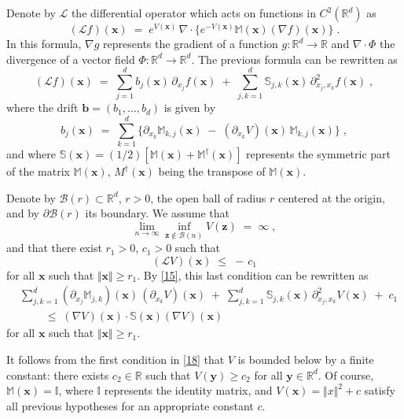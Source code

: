 \documentclass[reqno]{amsart}
\newcounter{as}[section]
\newcommand{\mc}[1]{{\mathcal #1}}
\newcommand{\bb}[1]{{\mathbb #1}}
\newcommand{\bs}[1]{{\boldsymbol #1}}
\newcommand{\<}{\langle}
\renewcommand{\>}{\rangle}
\begin{document}
Denote by $\mathcal L$ the differential operator which acts on functions in
$C^2(\bb R^d)$ as
\begin{equation}\label{gen1}
(\mathcal L f) (\bs{x}) \;=\; e^{V(\bs{x})} \, \nabla \cdot
\big\{ e^{-V(\bs{x})} \bb M(\bs{x}) (\nabla f)(\bs{x}) \big\}\;.
\end{equation}
In this formula, $\nabla g$ represents the gradient of a function
$g\colon\bb R^d \to \bb R$ and $\nabla \cdot \Phi$ the divergence of a
vector field $\Phi \colon\bb R^d \to \bb R^d$.  The previous formula can
be rewritten as
\begin{equation}
\label{15}
(\mathcal L f) (\bs{x}) \;=\; \sum_{j=1}^d b_j(\bs{x}) \, \partial_{x_j} f (\bs{x})
\;+\; \sum_{j,k=1}^d \bb S_{j,k} (\bs{x}) \, \partial^2_{x_j, x_k} f (\bs{x}) \;,
\end{equation}
where the drift $\bs b=(b_1, \dots, b_d)$ is given by
\begin{equation}
\label{drift1}
b_j(\bs{x}) \;=\; \sum_{k=1}^d \Big\{  \partial_{x_k} \bb M_{k,j}(\bs{x})
\;-\; (\partial_{x_k} V) (\bs{x}) \, \bb M_{k,j}(\bs{x}) \Big\}\;,
\end{equation}
and where $\bb S(\bs{x}) = (1/2) [\bb M(\bs{x}) + \bb M^\dagger(\bs{x})]$ represents the symmetric part of the matrix $\bb
M (\bs{x})$,
$M^\dagger(\bs{x})$ being the transpose of $\bb M(\bs{x})$.

Denote by $\mc B(r)\subset \bb R^d$, $r>0$, the open ball of radius $r$ centered at the
origin, and by $\partial \mc B(r)$ its boundary. We assume that
\begin{equation}
\label{18}
\lim_{n\to\infty} \inf_{\bs z\not\in \mc B(n)} V(\bs z) \;=\; \infty\;,
\end{equation}
and that there exist $r_1>0$, $c_1>0$ such that
\begin{equation}
\label{20}
(\mathcal L V)(\bs{x}) \;\le\; -\, c_1
\end{equation}
for all $\bs x$ such that $\Vert \bs x\Vert \ge r_1$. By \eqref{15},
this last condition can be rewritten as
\begin{align*}
& \sum_{j,k=1}^d (\partial_{x_j} \bb M_{j,k})(\bs{x}) \, (\partial_{x_k} V) (\bs{x})
\;+\; \sum_{j,k=1}^d \bb S_{j,k} (\bs{x}) \, \partial^2_{x_j, x_k} V (\bs{x})
\;+\; c_1 \\
&\qquad \;\le\;  (\nabla V)(\bs{x}) \cdot \bb S(\bs{x}) (\nabla V)(\bs{x})
\end{align*}
for all $\bs x$ such that $\Vert \bs x\Vert \ge r_1$.

It follows from the first condition in \eqref{18} that $V$ is bounded
below by a finite constant: there exists $c_2\in \bb R$ such that
$V(\bs{y}) \ge c_2$ for all $\bs y\in\bb R^d$. Of course, $\bb M(\bs{x}) = \bb I$,
where $\bb I$ represents the identity matrix, and $V(\bs{x}) = \Vert
x\Vert^2 + c$ satisfy all previous hypotheses for an appropriate
constant $c$.
\end{document}
